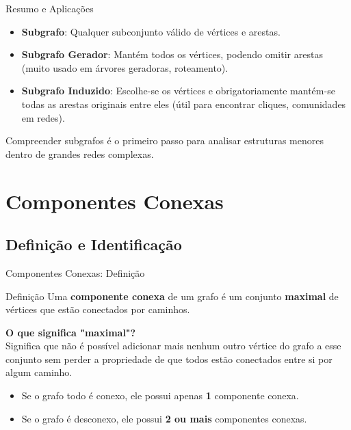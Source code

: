 \documentclass[9pt]{beamer}
\begin{document}
\begin{frame}{Resumo e Aplicações}
    \begin{itemize}
        \item \textbf{Subgrafo}: Qualquer subconjunto válido de vértices e arestas.
        \item \textbf{Subgrafo Gerador}: Mantém todos os vértices, podendo omitir arestas (muito usado em árvores geradoras, roteamento).
        \item \textbf{Subgrafo Induzido}: Escolhe-se os vértices e obrigatoriamente mantém-se todas as arestas originais entre eles (útil para encontrar cliques, comunidades em redes).
    \end{itemize}
    \vspace{0.5cm}
    Compreender subgrafos é o primeiro passo para analisar estruturas menores dentro de grandes redes complexas.
\end{frame}

\section{Componentes Conexas}
\subsection{Definição e Identificação}
\begin{frame}{Componentes Conexas: Definição}
    \begin{block}{Definição}
        Uma \textbf{componente conexa} de um grafo é um conjunto \textbf{maximal} de vértices que estão conectados por caminhos.
    \end{block}
    \vspace{0.5cm}
    \textbf{O que significa "maximal"?} \\
    Significa que não é possível adicionar mais nenhum outro vértice do grafo a esse conjunto sem perder a propriedade de que todos estão conectados entre si por algum caminho.
    \vspace{0.3cm}
    \begin{itemize}
        \item Se o grafo todo é conexo, ele possui apenas \textbf{1} componente conexa.
        \item Se o grafo é desconexo, ele possui \textbf{2 ou mais} componentes conexas.
    \end{itemize}
\end{frame}
\end{document}

